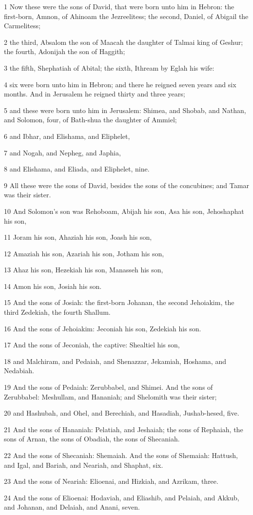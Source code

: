 \par 1 Now these were the sons of David, that were born unto him in Hebron: the first-born, Amnon, of Ahinoam the Jezreelitess; the second, Daniel, of Abigail the Carmelitess;
\par 2 the third, Absalom the son of Maacah the daughter of Talmai king of Geshur; the fourth, Adonijah the son of Haggith;
\par 3 the fifth, Shephatiah of Abital; the sixth, Ithream by Eglah his wife:
\par 4 six were born unto him in Hebron; and there he reigned seven years and six months. And in Jerusalem he reigned thirty and three years;
\par 5 and these were born unto him in Jerusalem: Shimea, and Shobab, and Nathan, and Solomon, four, of Bath-shua the daughter of Ammiel;
\par 6 and Ibhar, and Elishama, and Eliphelet,
\par 7 and Nogah, and Nepheg, and Japhia,
\par 8 and Elishama, and Eliada, and Eliphelet, nine.
\par 9 All these were the sons of David, besides the sons of the concubines; and Tamar was their sister.
\par 10 And Solomon's son was Rehoboam, Abijah his son, Asa his son, Jehoshaphat his son,
\par 11 Joram his son, Ahaziah his son, Joash his son,
\par 12 Amaziah his son, Azariah his son, Jotham his son,
\par 13 Ahaz his son, Hezekiah his son, Manasseh his son,
\par 14 Amon his son, Josiah his son.
\par 15 And the sons of Josiah: the first-born Johanan, the second Jehoiakim, the third Zedekiah, the fourth Shallum.
\par 16 And the sons of Jehoiakim: Jeconiah his son, Zedekiah his son.
\par 17 And the sons of Jeconiah, the captive: Shealtiel his son,
\par 18 and Malchiram, and Pedaiah, and Shenazzar, Jekamiah, Hoshama, and Nedabiah.
\par 19 And the sons of Pedaiah: Zerubbabel, and Shimei. And the sons of Zerubbabel: Meshullam, and Hananiah; and Shelomith was their sister;
\par 20 and Hashubah, and Ohel, and Berechiah, and Hasadiah, Jushab-hesed, five.
\par 21 And the sons of Hananiah: Pelatiah, and Jeshaiah; the sons of Rephaiah, the sons of Arnan, the sons of Obadiah, the sons of Shecaniah.
\par 22 And the sons of Shecaniah: Shemaiah. And the sons of Shemaiah: Hattush, and Igal, and Bariah, and Neariah, and Shaphat, six.
\par 23 And the sons of Neariah: Elioenai, and Hizkiah, and Azrikam, three.
\par 24 And the sons of Elioenai: Hodaviah, and Eliashib, and Pelaiah, and Akkub, and Johanan, and Delaiah, and Anani, seven.

